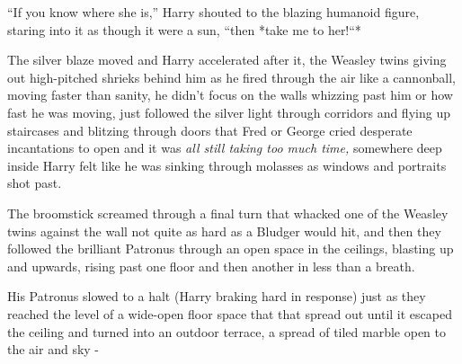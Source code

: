 ``If you know where she is,'' Harry shouted to the blazing humanoid
figure, staring into it as though it were a sun, ``then *take me to
her!``*

The silver blaze moved and Harry accelerated after it, the Weasley twins
giving out high-pitched shrieks behind him as he fired through the air
like a cannonball, moving faster than sanity, he didn't focus on the
walls whizzing past him or how fast he was moving, just followed the
silver light through corridors and flying up staircases and blitzing
through doors that Fred or George cried desperate incantations to open
and it was \emph{all still taking too much time,} somewhere deep inside
Harry felt like he was sinking through molasses as windows and portraits
shot past.

The broomstick screamed through a final turn that whacked one of the
Weasley twins against the wall not quite as hard as a Bludger would hit,
and then they followed the brilliant Patronus through an open space in
the ceilings, blasting up and upwards, rising past one floor and then
another in less than a breath.

His Patronus slowed to a halt (Harry braking hard in response) just as
they reached the level of a wide-open floor space that that spread out
until it escaped the ceiling and turned into an outdoor terrace, a
spread of tiled marble open to the air and sky -
